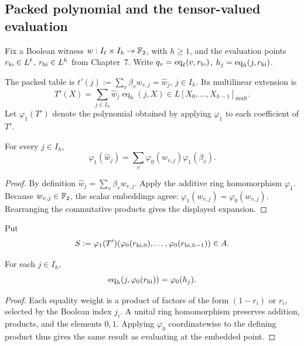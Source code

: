 \subsection{Packed polynomial and the tensor-valued evaluation}\label{sec:dpr:eval}
Fix a Boolean witness $w:I_\ell\times I_h\to\mathbb{F}_2$,
with $h\geq1$, and the evaluation points
$r_{\rm lo}\in L^\ell$, $r_{\rm hi}\in L^h$
from Chapter~7. Write $q_v=\operatorname{eq}_\ell
(v,r_{\rm lo})$, $h_j=\operatorname{eq}_h(j,r_{\rm hi})$.

\begin{definition}\label{def:dpr:packed-poly}
The packed table is
$t'(j):=\sum_v\beta_vw_{v,j}=\widehat w_j$,
$j\in I_h$. Its multilinear extension
is
\[
 T'(X)=\sum_{j\in I_h}\widehat w_j
 \operatorname{eq}_h(j,X)\in
 L[X_0,\ldots,X_{h-1}]_{\mathrm{mult}}.
\]
Let $\varphi_1(T')$ denote the polynomial
obtained by applying $\varphi_1$ to each
coefficient of $T'$.
\end{definition}

\begin{lemma}\label{lem:dpr:tensor-column}
For every $j\in I_h$,
\[
 \varphi_1(\widehat w_j)
 =\sum_v\varphi_0(w_{v,j})\varphi_1(\beta_v).
\]
\end{lemma}
\begin{proof}
By definition
$\widehat w_j=\sum_v\beta_vw_{v,j}$.
Apply the additive ring homomorphism
$\varphi_1$.
Because $w_{v,j}\in\mathbb{F}_2$, the scalar
embeddings agree:
$\varphi_1(w_{v,j})=\varphi_0(w_{v,j})$.
Rearranging the commutative products
gives the displayed expansion.
\end{proof}

\begin{definition}\label{def:dpr:tensor-S}
Put
\[
 S:=\varphi_1(T')(
 \varphi_0(r_{{\rm hi},0}),\ldots,
 \varphi_0(r_{{\rm hi},h-1}))\in A.
\]
\end{definition}

\begin{lemma}\label{lem:dpr:eq-embedded}
For each $j\in I_h$,
\[
 \operatorname{eq}_h(j,\varphi_0(r_{\rm hi}))
 =\varphi_0(h_j).
\]
\end{lemma}
\begin{proof}
Each equality weight is a product of
factors of the form $(1-r_i)$ or $r_i$,
selected by the Boolean index $j_i$.
A unital ring homomorphism preserves
addition, products, and the elements
$0,1$. Applying $\varphi_0$
coordinatewise to the defining product
thus gives the same result as evaluating
at the embedded point.
\end{proof}

